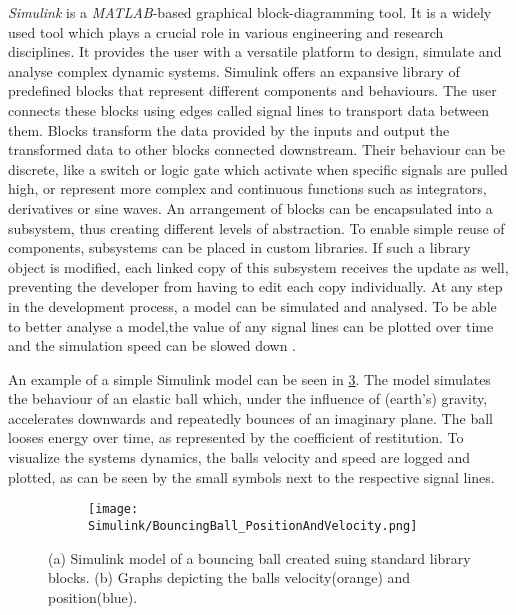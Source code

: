 \textit{Simulink\textsuperscript{\textregistered}} is a \textit{MATLAB\textsuperscript{\textregistered}}-based graphical block-diagramming tool. 
It is a widely used tool which plays a crucial role in various engineering and research disciplines.
It provides the user with a versatile platform to design, simulate and analyse complex dynamic systems.
Simulink offers an expansive library of predefined blocks that represent different components and behaviours.
The user connects these blocks using edges called signal lines to transport data between them.
Blocks transform the data provided by the inputs and output the transformed data to other blocks connected downstream.
Their behaviour can be discrete, like a switch or logic gate which activate when specific signals are pulled high, or represent more complex and continuous functions such as integrators, derivatives or sine waves.
An arrangement of blocks can be encapsulated into a subsystem, thus creating different levels of abstraction.
To enable simple reuse of components, subsystems can be placed in custom libraries.
If such a library object is modified, each linked copy of this subsystem receives the update as well, preventing the developer from having to edit each copy individually.
At any step in the development process, a model can be simulated and analysed.
To be able to better analyse a model,the value of any signal lines can be plotted over time and the simulation speed can be slowed down \parencite{matlabSimulinkDocumention}.

An example of a simple Simulink model can be seen in \ref{figure: Simulink bouncing ball example}.
The model simulates the behaviour of an elastic ball which, under the influence of (earth's) gravity, accelerates downwards and repeatedly bounces of an imaginary plane.
The ball looses energy over time, as represented by the coefficient of restitution.
To visualize the systems dynamics, the balls velocity and speed are logged and plotted, as can be seen by the small symbols next to the respective signal lines.

\begin{figure}[h!]
	\begin{subfigure}{.5\textwidth} %
		\centering
		\caption{}
		\label{figure: Simulink bouncing ball model}
	\end{subfigure}
	\begin{subfigure}{.5\textwidth}
		\centering
		\texttt{[image: Simulink/BouncingBall\_PositionAndVelocity.png]}  
		\caption{}
		\label{figure: Simulink bouncing ball graphs}
	\end{subfigure}
	\caption[Simulink bouncing ball example]{(a) Simulink model of a bouncing ball created suing standard library blocks. (b) Graphs depicting the balls velocity(orange) and position(blue).}
	\label{figure: Simulink bouncing ball example}
\end{figure}


